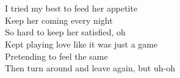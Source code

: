\\
\\
I tried my best to feed her appetite \\
Keep her coming every night \\
So hard to keep her satisfied, oh \\
Kept playing love like it was just a game \\
Pretending to feel the same \\
Then turn around and leave again, but uh-oh \\
